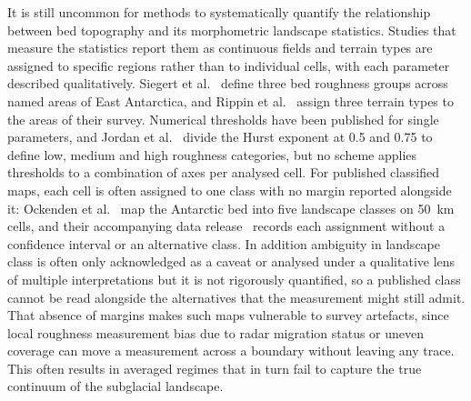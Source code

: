 It is still uncommon for methods to systematically quantify the relationship between bed topography and its morphometric landscape statistics. Studies that measure the statistics report them as continuous fields and terrain types are assigned to specific regions rather than to individual cells, with each parameter described qualitatively. Siegert et al.~\cite{Siegert_2004} define three bed roughness groups across named areas of East Antarctica, and Rippin et al.~\cite{Rippin_2014} assign three terrain types to the areas of their survey. Numerical thresholds have been published for single parameters, and Jordan et al.~\cite{Jordan_2017} divide the Hurst exponent at 0.5 and 0.75 to define low, medium and high roughness categories, but no scheme applies thresholds to a combination of axes per analysed cell. For published classified maps, each cell is often assigned to one class with no margin reported alongside it: Ockenden et al.~\cite{Ockenden_2026} map the Antarctic bed into five landscape classes on 50~km cells, and their accompanying data release~\cite{Ockenden_2025_data} records each assignment without a confidence interval or an alternative class. In addition ambiguity in landscape class is often only acknowledged as a caveat or analysed under a qualitative lens of multiple interpretations but it is not rigorously quantified, so a published class cannot be read alongside the alternatives that the measurement might still admit. That absence of margins makes such maps vulnerable to survey artefacts, since local roughness measurement bias due to radar migration status or uneven coverage can move a measurement across a boundary without leaving any trace. This often results in averaged regimes that in turn fail to capture the true continuum of the subglacial landscape.

